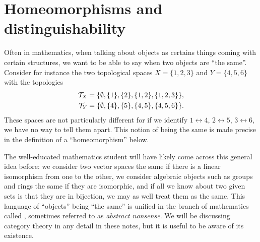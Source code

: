 \section{Homeomorphisms and distinguishability}
\label{homeomorphisms}
Often in mathematics, when talking about objects as certains things coming with certain structures, we want to be able to say when two objects are ``the same''. Consider for instance the two topological spaces $X = \{ 1 , 2 , 3 \}$ and $Y = \{ 4, 5, 6 \}$ with the topologies
\begin{align*}
  \mathcal{T}_X &= \{ \emptyset, \{1 \}, \{ 2 \}, \{ 1, 2 \}, \{1,2,3\} \}, \\
  \mathcal{T}_Y &= \{ \emptyset, \{4 \}, \{ 5 \}, \{ 4, 5 \}, \{4,5,6\} \}.
\end{align*}
These spaces are not particularly different for if we identify $1 \leftrightarrow 4$, $2 \leftrightarrow 5$, $3 \leftrightarrow 6$, we have no way to tell them apart. This notion of being the same is made precise in the definition of a ``homeomorphism'' below.

The well-educated mathematics student will have likely come across this general idea before: we consider two vector spaces the same if there is a linear isomorphism from one to the other, we consider algebraic objects such as groups and rings the same if they are isomorphic, and if all we know about two given sets is that they are in bijection, we may as well treat them as the same. This language of ``objects'' being ``the same'' is unified in the branch of mathematics called , sometimes referred to as \emph{abstract nonsense}. We will be discussing category theory in any detail in these notes, but it is useful to be aware of its existence.

